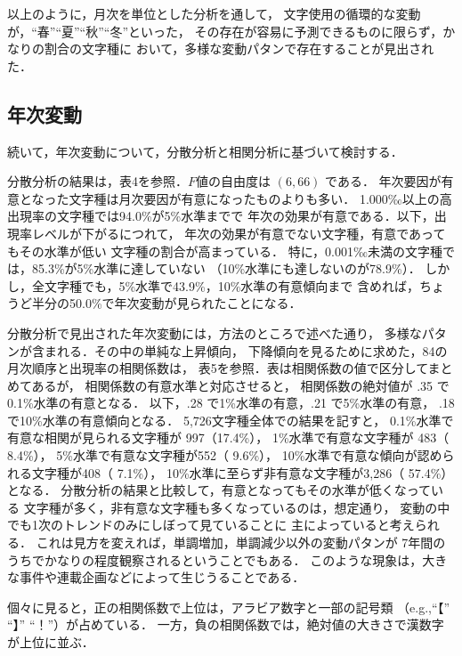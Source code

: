   以上のように，月次を単位とした分析を通して，
文字使用の循環的な変動が，“春”“夏”“秋”“冬”といった，
その存在が容易に予測できるものに限らず，かなりの割合の文字種に
おいて，多様な変動パタンで存在することが見出された．


\subsection{年次変動}

  続いて，年次変動について，分散分析と相関分析に基づいて検討する．

  分散分析の結果は，表4を参照．$F$値の自由度は $(6,66)$ である．
年次要因が有意となった文字種は月次要因が有意になったものよりも多い．
1.000‰以上の高出現率の文字種では94.0\%が5\%水準までで
年次の効果が有意である．以下，出現率レベルが下がるにつれて，
年次の効果が有意でない文字種，有意であってもその水準が低い
文字種の割合が高まっている．
特に，\hbox{0.001‰}未満の文字種では，85.3\%が5\%水準に達していない
（10\%水準にも達しないのが78.9\%）．
しかし，全文字種でも，5\%水準で43.9\%，10\%水準の有意傾向まで
含めれば，ちょうど半分の50.0\%で年次変動が見られたことになる．

  分散分析で見出された年次変動には，方法のところで述べた通り，
多様なパタンが含まれる．その中の単純な上昇傾向，
下降傾向を見るために求めた，84の月次順序と出現率の相関係数は，
表5を参照．表は相関係数の値で区分してまとめてあるが，
相関係数の有意水準と対応させると，
相関係数の絶対値が .35 で0.1\%水準の有意となる．
以下，.28 で1\%水準の有意，.21 で5\%水準の有意，
.18 で10\%水準の有意傾向となる．
5,726文字種全体での結果を記すと，
0.1\%水準で有意な相関が見られる文字種が 997（17.4\%），
1\%水準で有意な文字種が 483（ 8.4\%），
5\%水準で有意な文字種が552（ 9.6\%），
10\%水準で有意な傾向が認められる文字種が408（ 7.1\%），
10\%水準に至らず非有意な文字種が3,286（ 57.4\%）となる．
分散分析の結果と比較して，有意となってもその水準が低くなっている
文字種が多く，非有意な文字種も多くなっているのは，想定通り，
変動の中でも1次のトレンドのみにしぼって見ていることに
主によっていると考えられる．
これは見方を変えれば，単調増加，単調減少以外の変動パタンが
7年間のうちでかなりの程度観察されるということでもある．
このような現象は，大きな事件や連載企画などによって生じうることである．


  個々に見ると，正の相関係数で上位は，アラビア数字と一部の記号類
（e.g.,“【” “】” “！”）が占めている．
一方，負の相関係数では，絶対値の大きさで漢数字が上位に並ぶ．

